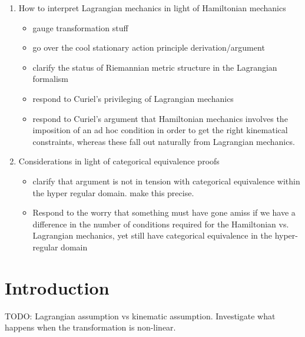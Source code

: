 \documentclass[letterpaper]{article}
\begin{document}
\begin{enumerate}[1.)]
\begin{itemize}
\end{itemize}

\item How to interpret Lagrangian mechanics in light of Hamiltonian mechanics

\begin{itemize}

\item gauge transformation stuff
\item go over the cool stationary action principle derivation/argument
\item clarify the status of Riemannian metric structure in the Lagrangian formalism
\item respond to Curiel's privileging of Lagrangian mechanics
\item respond to Curiel's argument that Hamiltonian mechanics involves the imposition of an ad hoc condition in order to get the right kinematical constraints, whereas these fall out naturally from Lagrangian mechanics.


\end{itemize}

\item Considerations in light of categorical equivalence proofs

\begin{itemize}

\item  clarify that argument is not in tension with categorical equivalence within the hyper regular domain. make this precise.
\item Respond to the worry that something must have gone amiss if we have a difference in the number of conditions required for the Hamiltonian vs. Lagrangian mechanics, yet still have categorical equivalence in the hyper-regular domain

\end{itemize}

\end{enumerate}

\section{Introduction}

TODO: Lagrangian assumption vs kinematic assumption. Investigate what happens when the transformation is non-linear.
\end{document}
